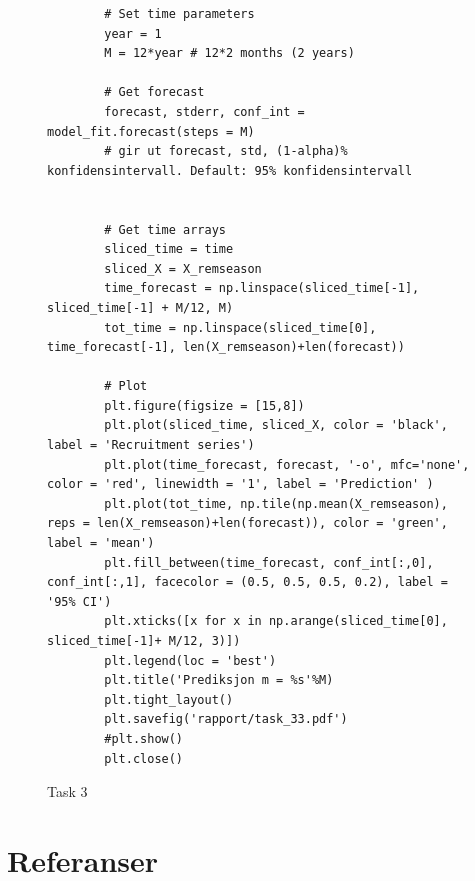 \begin{figure}[hbt!]
    \begin{lstlisting}
        # Set time parameters
        year = 1
        M = 12*year # 12*2 months (2 years)

        # Get forecast
        forecast, stderr, conf_int = model_fit.forecast(steps = M)
        # gir ut forecast, std, (1-alpha)% konfidensintervall. Default: 95% konfidensintervall
        
        
        # Get time arrays
        sliced_time = time
        sliced_X = X_remseason
        time_forecast = np.linspace(sliced_time[-1], sliced_time[-1] + M/12, M)
        tot_time = np.linspace(sliced_time[0], time_forecast[-1], len(X_remseason)+len(forecast))

        # Plot
        plt.figure(figsize = [15,8])
        plt.plot(sliced_time, sliced_X, color = 'black', label = 'Recruitment series')
        plt.plot(time_forecast, forecast, '-o', mfc='none', color = 'red', linewidth = '1', label = 'Prediction' )
        plt.plot(tot_time, np.tile(np.mean(X_remseason), reps = len(X_remseason)+len(forecast)), color = 'green', label = 'mean')
        plt.fill_between(time_forecast, conf_int[:,0], conf_int[:,1], facecolor = (0.5, 0.5, 0.5, 0.2), label = '95% CI')
        plt.xticks([x for x in np.arange(sliced_time[0], sliced_time[-1]+ M/12, 3)])
        plt.legend(loc = 'best')
        plt.title('Prediksjon m = %s'%M)
        plt.tight_layout()
        plt.savefig('rapport/task_33.pdf')
        #plt.show()
        plt.close()
    \end{lstlisting}
\caption{Task 3}
\label{Kode5}
\end{figure}







\section{Referanser}
\begingroup
\renewcommand{\section}[2]{}%


\endgroup



 








